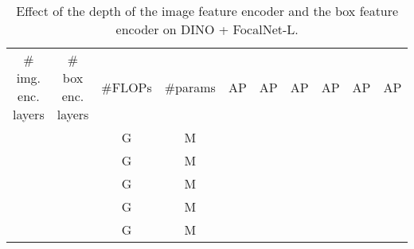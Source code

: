 \documentclass[10pt,twocolumn,letterpaper]{article}
\begin{document}
\begin{table*}[h]
\begin{minipage}[t]{1\linewidth}
\vspace{2mm}
\centering
\setlength{\tabcolsep}{12pt}
\footnotesize
\renewcommand{\arraystretch}{1.35}
\resizebox{1.0\linewidth}{!}
{
\begin{tabular}{c|c|c|c|cccccc}
\# img. enc. layers & \# box enc. layers  & \#FLOPs & \#params & AP & AP & AP & AP & AP & AP \\
\shline
 &   &  G &  M &  &  &  &  &  &  \\
 &   &  G &  M &  &  &  &  &  &   \\
\rowcolor{gray!10} &   &  G &  M &  &  &  &  &  &   \\
 &  &  G &  M &  &  &  &  &  &  \\
 &  &  G &  M &  &  &  &  &  &  \\
\end{tabular}
}
\caption{\small{{
Effect of the depth of the image feature encoder and the box feature encoder on DINO + FocalNet-L.}}
}
\label{tab:feat_enc_depth_ablate}
\end{minipage}
\end{table*}
\end{document}
